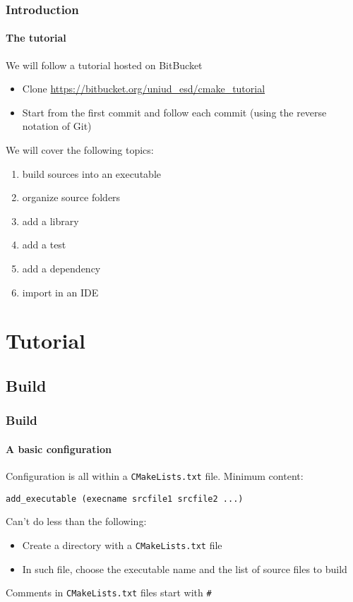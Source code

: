 \begin{frame}
\frametitle{Introduction}
\framesubtitle{The tutorial}

\begin{block}{We will follow a tutorial hosted on BitBucket}
\begin{itemize}
\item Clone \url{https://bitbucket.org/uniud_esd/cmake_tutorial}
\item Start from the first commit and follow each commit (using the reverse notation of Git)
\end{itemize}
\end{block}
\pause
\begin{block}{We will cover the following topics:}
\begin{enumerate}
\item build sources into an executable
\item organize source folders
\item add a library
\item add a test
\item add a dependency 
\item import in an IDE
\end{enumerate}
\end{block}
\end{frame}

\section{Tutorial}

\subsection{Build}

\begin{frame}[fragile]
\frametitle{Build}
\framesubtitle{A basic configuration}

Configuration is all within a \texttt{CMakeLists.txt} file. Minimum content:

\begin{verbatim}
add_executable (execname srcfile1 srcfile2 ...)
\end{verbatim}
  
\begin{block}{Can't do less than the following:}
\begin{itemize}
\item Create a directory with a \texttt{CMakeLists.txt} file
\item In such file, choose the executable name and the list of source files to build
\end{itemize}
Comments in \texttt{CMakeLists.txt} files start with \texttt{\#}
\end{block}

\end{frame}

